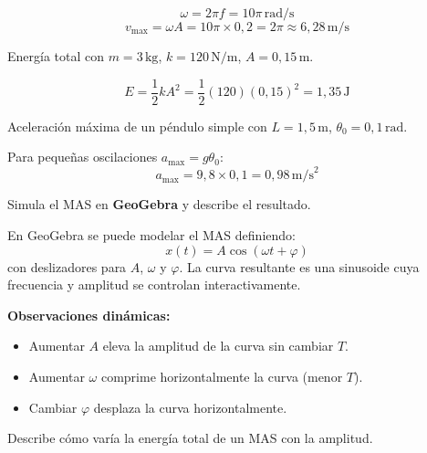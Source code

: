 \documentclass[12pt, a4paper, oneside]{book}
\newcommand{\Nm}{\,\text{N/m}}
\newcommand{\rad}{\,\text{rad/s}}
\newcommand{\kg}{\,\text{kg}}
\newcommand{\ms}{\,\text{m/s}}
\newcommand{\mss}{\,\text{m/s}^{2}}
\newcommand{\mts}{\,\text{m}}
\begin{document}
\begin{solucion}
\[
  \omega = 2\pi f = 10\pi\rad
\]
\[
  \boxed{v_{\max} = \omega A = 10\pi \times 0{,}2 = 2\pi \approx 6{,}28\ms}
\]
\end{solucion}

\begin{problema}[title={Problema~21}]
Energ\'ia total con $m = 3\kg$, $k = 120\Nm$, $A = 0{,}15\mts$.
\end{problema}

\begin{solucion}
\[
  \boxed{E = \dfrac{1}{2}kA^{2} = \dfrac{1}{2}(120)(0{,}15)^{2} = 1{,}35\,\text{J}}
\]
\end{solucion}

\begin{problema}[title={Problema~22}]
Aceleraci\'on m\'axima de un p\'endulo simple con $L = 1{,}5\mts$,
$\theta_{0} = 0{,}1\,\text{rad}$.
\end{problema}

\begin{solucion}
Para peque\~nas oscilaciones $a_{\max} = g\theta_{0}$:
\[
  \boxed{a_{\max} = 9{,}8 \times 0{,}1 = 0{,}98\mss}
\]
\end{solucion}

\begin{problema}[title={Problema~23}]
Simula el MAS en \textbf{GeoGebra} y describe el resultado.
\end{problema}

\begin{solucion}
En GeoGebra se puede modelar el MAS definiendo:
\[
  x(t) = A\cos(\omega t + \varphi)
\]
con deslizadores para $A$, $\omega$ y $\varphi$. La curva resultante es una
sinusoide cuya frecuencia y amplitud se controlan interactivamente.

\textbf{Observaciones din\'amicas:}
\begin{itemize}[leftmargin=*]
  \item Aumentar $A$ eleva la amplitud de la curva sin cambiar $T$.
  \item Aumentar $\omega$ comprime horizontalmente la curva (menor $T$).
  \item Cambiar $\varphi$ desplaza la curva horizontalmente.
\end{itemize}
\end{solucion}

\begin{problema}[title={Problema~24}]
Describe c\'omo var\'ia la energ\'ia total de un MAS con la amplitud.
\end{problema}
\end{document}
